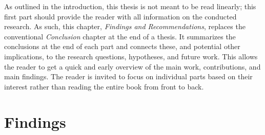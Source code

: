 As outlined in the introduction, this thesis is not meant to be read linearly; this first part should provide the reader with all information on the conducted research. As such, this chapter, \textit{Findings and Recommendations}, replaces the conventional \textit{Conclusion} chapter at the end of a thesis. It summarizes the conclusions at the end of each part and connects these, and potential other implications, to the research questions, hypotheses, and future work. This allows the reader to get a quick and early overview of the main work, contributions, and main findings. The reader is invited to focus on individual parts based on their interest rather than reading the entire book from front to back.

\section{Findings}
